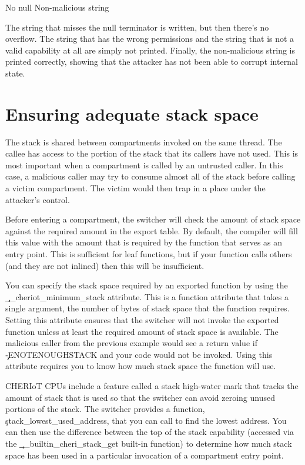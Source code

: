 \begin{console}
No null
Non-malicious string
\end{console}

The string that misses the null terminator is written, but then there's no overflow.
The string that has the wrong permissions and the string that is not a valid capability at all are simply not printed.
Finally, the non-malicious string is printed correctly, showing that the attacker has not been able to corrupt internal state.

\section{Ensuring adequate stack space}

The stack is shared between compartments invoked on the same thread.
The callee has access to the portion of the stack that its callers have not used.
This is most important when a compartment is called by an untrusted caller.
In this case, a malicious caller may try to consume almost all of the stack before calling a victim compartment.
The victim would then trap in a place under the attacker's control.

Before entering a compartment, the switcher will check the amount of stack space against the required amount in the export table.
By default, the compiler will fill this value with the amount that is required by the function that serves as an entry point.
This is sufficient for leaf functions, but if your function calls others (and they are not inlined) then this will be insufficient.

You can specify the stack space required by an exported function by using the \c{__cheriot_minimum_stack} attribute.
This is a function attribute that takes a single argument, the number of bytes of stack space that the function requires.
Setting this attribute ensures that the switcher will not invoke the exported function unless at least the required amount of stack space is available.
The malicious caller from the previous example would see a return value if \c{-ENOTENOUGHSTACK} and your code would not be invoked.
Using this attribute requires you to know how much stack space the function will use.

CHERIoT CPUs include a feature called a stack high-water mark that tracks the amount of stack that is used so that the switcher can avoid zeroing unused portions of the stack.
The switcher provides a function, \c{stack_lowest_used_address}, that you can call to find the lowest address.
You can then use the difference between the top of the stack capability (accessed via the \c{__builtin_cheri_stack_get} built-in function) to determine how much stack space has been used in a particular invocation of a compartment entry point.

